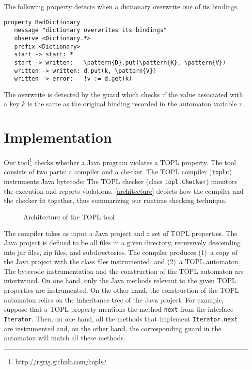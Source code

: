 \documentclass[9pt, preprint]{sigplanconf} %
\newcommand{\delimitVerbatim}{\par\nobreak\smallskip\noindent}
\newcommand{\pattern}[1]{\ensuremath{\mathtt{\underline{#1}}}}
\theoremstyle{definition}
\theoremstyle{remark}
\begin{document}
The following property detects when a dictionary overwrite one of its bindings.
\delimitVerbatim
\begin{Verbatim}[commandchars=\\\{\}]
 property BadDictionary
   message "dictionary overwrites its bindings"
   observe <Dictionary.*>
   prefix <Dictionary>
   start -> start: *
   start -> written:   \pattern{D}.put(\pattern{K}, \pattern{V})
   written -> written: d.put(k, \pattern{V})
   written -> error:   !v := d.get(k)
\end{Verbatim}
\delimitVerbatim
The overwrite is detected by the guard which checks if the value associated with a key $k$ is the same as the original binding recorded in the automaton variable $v$.

\section{Implementation} \label{sec:implementation} %

Our tool\footnote{\url{http://rgrig.github.com/topl}} checks whether a Java program violates a TOPL property.
The tool consists of two parts: a compiler and a checker.
The TOPL compiler ({\tt toplc}) instruments Java bytecode;
The TOPL checker (class {\tt topl.Checker}) monitors the execution and reports violations.
\autoref{architecture} depicts how the compiler and the checker fit together, thus summarizing our runtime checking technique.

\begin{figure*}[t]
\begin{center}

\caption{Architecture of the TOPL tool}
\label{architecture}
\end{center}
\end{figure*}

The compiler takes as input a Java project and a set of TOPL properties.
The Java project is defined to be all files in a given directory, recursively descending into jar files, zip files, and subdirectories.
The compiler produces (1)~a copy of the Java project with the class files instrumented, and (2)~a TOPL automaton.
The bytecode instrumentation and the construction of the TOPL automaton are intertwined.
On one hand, only the Java methods relevant to the given TOPL properties are instrumented.
On the other hand, the construction of the TOPL automaton relies on the inheritance tree of the Java project.
For example, suppose that a TOPL property mentions the method {\tt next} from the interface {\tt Iterator}.
Then, on one hand, all the methods that implement {\tt Iterator.next} are instrumented and, on the other hand, the corresponding guard in the automaton will match all these methods.
\end{document}
